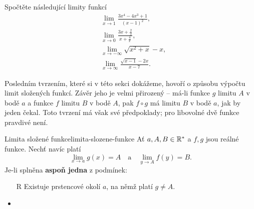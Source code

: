 \begin{exercise}{}{}
 Spočtěte následující limity funkcí
 \begin{align*}
  &\lim_{x \to 1} \frac{3x^{4} - 4x^3 + 1}{(x-1)^2},\\
  &\lim_{x \to 0} \frac{3x + \frac{2}{x}}{x + \frac{4}{x}},\\
  &\lim_{x \to -\infty} \sqrt{x^2 + x} - x,\\
  &\lim_{x \to \infty} \frac{\sqrt{x-1}-2x}{x-7}.
 \end{align*}
\end{exercise}

Posledním tvrzením, které si v této sekci dokážeme, hovoří o způsobu výpočtu
limit složených funkcí. Závěr jeho je velmi přirozený -- má-li funkce $g$ limitu
$A$ v bodě $a$ a funkce $f$ limitu $B$ v bodě $A$, pak $f \circ g$ má limitu $B$
v bodě $a$, jak by jeden čekal. Toto tvrzení má však své předpoklady; pro
libovolné dvě funkce pravdivé není.

\begin{theorem}{Limita složené funkce}{limita-slozene-funkce}
 Ať $a,A,B \in \mathbb{R}^{*}$ a $f,g$ jsou reálné funkce. Nechť navíc platí
 \[
  \lim_{x \to a} g(x) = A \quad \text{a} \quad \lim_{y \to A} f(y) = B.
 \]
 Je-li splněna \textbf{aspoň jedna} z podmínek:
 \begin{itemize}
  \item [R] Existuje prstencové okolí $a$, na němž platí $g \neq A$.
  \item 
 \end{itemize}
\end{theorem}
